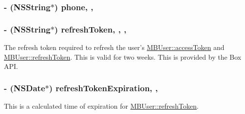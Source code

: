\hypertarget{interface_m_b_user_a09fb51588f5dee689d7ae9e71ef93199}{
\subsubsection[{phone}]{\setlength{\rightskip}{0pt plus 5cm}-\/ (N\-S\-String$\ast$) phone\hspace{0.3cm}{\ttfamily [read]}, {\ttfamily [nonatomic]}, {\ttfamily [strong]}}}\label{interface_m_b_user_a09fb51588f5dee689d7ae9e71ef93199}
\hypertarget{interface_m_b_user_a52a523200e9ed6203d66dc7250c725dd}{
\subsubsection[{refresh\-Token}]{\setlength{\rightskip}{0pt plus 5cm}-\/ (N\-S\-String$\ast$) refresh\-Token\hspace{0.3cm}{\ttfamily [read]}, {\ttfamily [write]}, {\ttfamily [nonatomic]}, {\ttfamily [strong]}}}\label{interface_m_b_user_a52a523200e9ed6203d66dc7250c725dd}
The refresh token required to refresh the user's \hyperlink{interface_m_b_user_aae7d6df5c0e6da13e80b3ddb82ae7081}{M\-B\-User\-::access\-Token} and \hyperlink{interface_m_b_user_a52a523200e9ed6203d66dc7250c725dd}{M\-B\-User\-::refresh\-Token}. This is valid for two weeks. This is provided by the Box A\-P\-I. \hypertarget{interface_m_b_user_a73ea1a88a0ebe4f2fe0e71809784ebfd}{
\subsubsection[{refresh\-Token\-Expiration}]{\setlength{\rightskip}{0pt plus 5cm}-\/ (N\-S\-Date$\ast$) refresh\-Token\-Expiration\hspace{0.3cm}{\ttfamily [read]}, {\ttfamily [nonatomic]}, {\ttfamily [strong]}}}\label{interface_m_b_user_a73ea1a88a0ebe4f2fe0e71809784ebfd}


This is a calculated time of expiration for \hyperlink{interface_m_b_user_a52a523200e9ed6203d66dc7250c725dd}{M\-B\-User\-::refresh\-Token}. 

